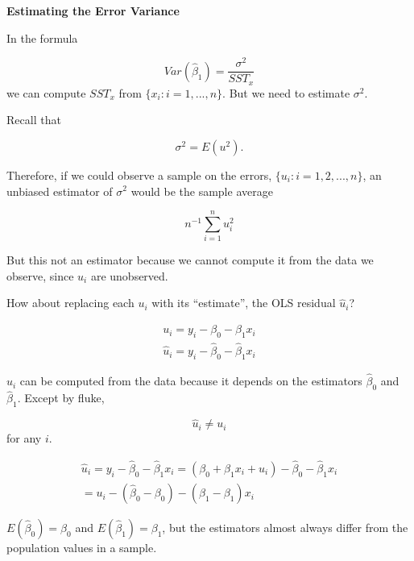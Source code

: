 \documentclass[notes=show]{beamer}
\begin{document}
\begin{frame}[plain]

\textbf{Estimating the Error Variance}

 In the formula

 \begin{equation}
  Var(\hat{\beta}_{1})=\frac{\sigma ^{2}}{SST_{x}}
 \end{equation}
we can compute $SST_{x}$ from $\{x_{i}:i=1,...,n\}$. But we need to estimate $\sigma ^{2}$.

Recall that

 \begin{equation}
  \sigma ^{2}=E(u^{2}).
 \end{equation}

\end{frame}

\begin{frame}[plain]
 Therefore, if we could observe a sample on the errors, $\{u_{i}:i=1,2,...,n\}$, an unbiased estimator of $\sigma ^{2}$ would be the sample average

 \begin{equation}
  n^{-1}\sum_{i=1}^{n}u_{i}^{2}
 \end{equation}

 But this not an estimator because we cannot compute it from the data we observe, since $u_{i}$ are unobserved.

 How about replacing each $u_{i}$ with its ``estimate'', the OLS residual $\hat{u}_{i}$?

 \begin{eqnarray*}
  u_{i}=y_{i}-\beta _{0}-\beta _{1}x_{i} \\
  \hat{u}_{i}=y_{i}-\hat{\beta}_{0}-\hat{\beta}_{1}x_{i}
 \end{eqnarray*}

\end{frame}

\begin{frame}[plain]

$\hat{u}_{i}$ can be computed from the data because it depends on the estimators $\hat{\beta}_{0}$ and $\hat{\beta}_{1}$. Except by fluke,

 \begin{equation}
  \hat{u}_{i}\neq u_{i}
 \end{equation}
for any $i$.

 \begin{eqnarray*}
 \hat{u}_{i}=y_{i}-\hat{\beta}_{0}-\hat{\beta}_{1}x_{i}=(\beta_{0}+\beta_{1}x_{i}+u_{i})-\hat{\beta}_{0}-\hat{\beta}_{1}x_{i}\\
 =u_{i}-(\hat{\beta}_{0}-\beta _{0})-(\hat{\beta}_{1}-\beta _{1})x_{i}
\end{eqnarray*}

$E(\hat{\beta}_{0})=\beta _{0}$ and $E(\hat{\beta}_{1})=\beta _{1}$, but the estimators almost always differ from the population values in a sample.
\end{frame}
\end{document}
